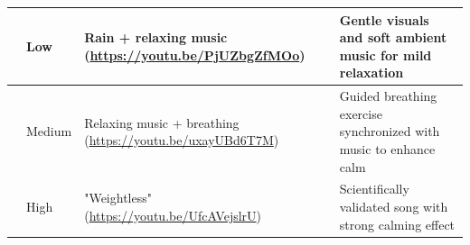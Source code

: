 \begin{table}[h]
\begin{tabular}{|>{\raggedright\arraybackslash}p{2.5cm}|>{\raggedright\arraybackslash}p{2.5cm}|>{\raggedright\arraybackslash}p{4cm}|>{\raggedright\arraybackslash}p{5.5cm}|}
    \multirow{3}{*}{Calmness} 
    & Low & Rain + relaxing music (\url{https://youtu.be/PjUZbgZfMOo}) & Gentle visuals and soft ambient music for mild relaxation \\
    \cline{2-4}
    & Medium & Relaxing music + breathing (\url{https://youtu.be/uxayUBd6T7M}) & Guided breathing exercise synchronized with music to enhance calm \\
    \cline{2-4}
    & High & "Weightless"(\url{https://youtu.be/UfcAVejslrU}) & Scientifically validated song with strong calming effect \\
    \hline
    \end{tabular}
\end{table}

\FloatBarrier%